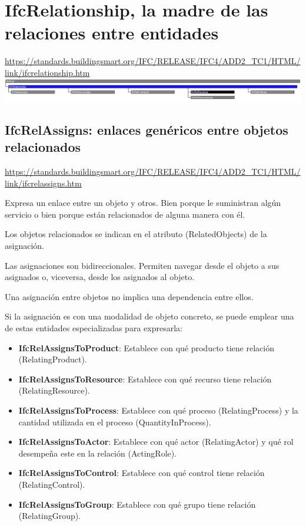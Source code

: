 \documentclass[spanish,12pt,a4paper,final,oneside]{book}
\begin{document}
\section{IfcRelationship, la madre de las relaciones entre entidades} \label{entidades_relaciones}
\url{https://standards.buildingsmart.org/IFC/RELEASE/IFC4/ADD2_TC1/HTML/link/ifcrelationship.htm}
\\ \includegraphics[width=\textwidth]{jerarquia de IfcRelationship}


\subsection{IfcRelAssigns: enlaces genéricos entre objetos relacionados}
\url{https://standards.buildingsmart.org/IFC/RELEASE/IFC4/ADD2_TC1/HTML/link/ifcrelassigns.htm}

Expresa un enlace entre un objeto y otros. Bien porque le suministran algún servicio o bien porque están relacionados de alguna manera con él.

Los objetos relacionados se indican en el atributo (RelatedObjects) de la asignación.

Las asignaciones son bidireccionales. Permiten navegar desde el objeto a sus asignados o, viceversa, desde los asignados al objeto.

Una asignación entre objetos no implica una dependencia entre ellos.

Si la asignación es con una modalidad de objeto concreto, se puede emplear una de estas entidades especializadas para expresarla:
\begin{itemize}

\item \textbf{IfcRelAssignsToProduct}: Establece con qué producto tiene relación (RelatingProduct).

\item \textbf{IfcRelAssignsToResource}: Establece con qué recurso tiene relación (RelatingResource).

\item \textbf{IfcRelAssignsToProcess}: Establece con qué proceso  (RelatingProcess) y la cantidad utilizada en el proceso (QuantityInProcess).

\item \textbf{IfcRelAssignsToActor}: Establece con qué actor (RelatingActor) y qué rol desempeña este en la relación (ActingRole).

\item \textbf{IfcRelAssignsToControl}: Establece con qué control tiene relación (RelatingControl).

\item \textbf{IfcRelAssignsToGroup}: Establece con qué grupo tiene relación (RelatingGroup).

\end{itemize}
\end{document}

